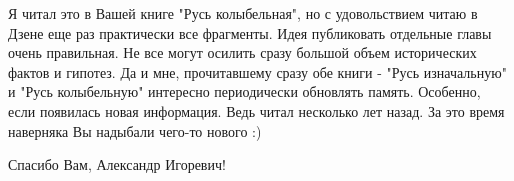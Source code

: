  
 
 
 
 
\begin{itemize}

Я читал это в Вашей книге "Русь колыбельная", но с удовольствием читаю в Дзене
еще раз практически все фрагменты. Идея публиковать отдельные главы очень
правильная. Не все могут осилить сразу большой объем исторических фактов и
гипотез. Да и мне, прочитавшему сразу обе книги - "Русь изначальную" и "Русь
колыбельную" интересно периодически обновлять память. Особенно, если появилась
новая информация. Ведь читал несколько лет назад. За это время наверняка Вы
надыбали чего-то нового :)

Спасибо Вам, Александр Игоревич!
\end{itemize}
